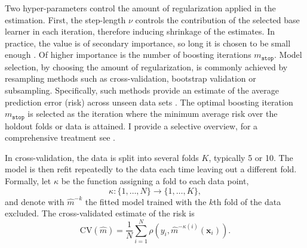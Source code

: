 Two hyper-parameters control the amount of regularization applied in the estimation. First, the step-length $\nu$ controls the contribution of the selected base learner in each iteration, therefore inducing shrinkage of the estimates. In practice, the value is of secondary importance, so long it is chosen to be small enough \autocite{schmidBoostingAdditiveModels2008}. Of higher importance is the number of boosting iterations $m_{\mathtt{stop}}$. Model selection, by choosing the amount of regularization, is commonly achieved by resampling methods such as cross-validation, bootstrap validation or subsampling.  Specifically, such methods provide an estimate of the average prediction error (risk) across unseen data sets \autocite{batesCrossvalidationWhatDoes2022, hastieElementsStatisticalLearning2009}. The optimal boosting iteration $m_{\mathtt{stop}}$ is selected as the iteration where the minimum average risk over the holdout folds or data is attained. I provide a selective overview, for a comprehensive treatment see \textcite{raschkaModelEvaluationModel2020, bischlResamplingMethodsMetaModel2012}.

In cross-validation, the data is split into several folds $K$, typically 5 or 10. The model is then refit repeatedly to the data each time leaving out a different fold. Formally, let $\kappa$ be the function assigning a fold to each data point, 
\begin{equation*}
	\kappa : \{1, \dots, N \} \rightarrow \{1, \dots, K\},
\end{equation*}
and denote with $\hat{m} ^{-k}$ the fitted model trained with the $k$th fold of the data excluded. The cross-validated estimate of the risk is 
\begin{equation*}
	\text{CV} (\hat{m}) = \frac{1}{N} \sum_{i = 1}^{N} \rho (y_i, \hat{m}^{-\kappa(i)}(\mathbf{x}_i)).
\end{equation*}

